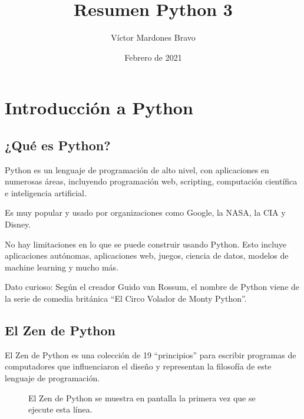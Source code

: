 \documentclass{article}
\title{Resumen Python 3}
\author{Víctor Mardones Bravo}
\date{Febrero de 2021}
\newcommand{\doble}[1]{``#1''}
\begin{document}

\null
\nointerlineskip
\vfill
\let\snewpage \newpage
\let\newpage \relax
  {\centering\def\svgwidth{\columnwidth}
  }
\maketitle
\let \newpage \snewpage
\vfill 
\break

\newpage


\section{Introducción a Python}

\subsection{¿Qué es Python?}

Python es un lenguaje de programación de alto nivel, con aplicaciones en numerosas áreas, incluyendo programación web, scripting, computación científica e inteligencia artificial.

Es muy popular y usado por organizaciones como Google, la NASA, la CIA y Disney.

No hay limitaciones en lo que se puede construir usando Python. Esto incluye aplicaciones autónomas, aplicaciones web, juegos, ciencia de datos, modelos de machine learning y mucho más.

Dato curioso: Según el creador Guido van Rossum, el nombre de Python viene de la serie de comedia británica \doble{El Circo Volador de Monty Python}.

\subsection{El Zen de Python}

El Zen de Python es una colección de 19 \doble{principios} para escribir programas de computadores que influenciaron el diseño y representan la filosofía de este lenguaje de programación.

\begin{figure*}[ht!]
  \caption{El Zen de Python se muestra en pantalla la primera vez que se ejecute esta línea.}
\end{figure*}
\end{document}
